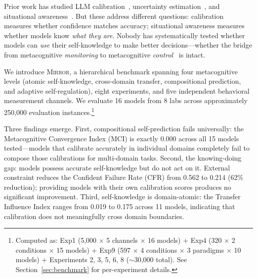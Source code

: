\documentclass[10pt]{article}
\newcommand{\mirror}{\textsc{Mirror}}
\newcommand{\MCI}{MCI}
\newcommand{\CFR}{CFR}
\begin{document}
Prior work has studied LLM calibration~\citep{kadavath2022language,
kapoor2024calibration}, uncertainty estimation~\citep{lin2024generating}, and
situational awareness~\citep{laine2024me}. But these address different questions:
calibration measures whether confidence matches accuracy; situational awareness
measures whether models know \textit{what they are}. Nobody has systematically
tested whether models can \textit{use} their self-knowledge to make better
decisions---whether the bridge from metacognitive \textit{monitoring} to
metacognitive \textit{control}~\citep{nelson1990metamemory} is intact.

We introduce \mirror{}, a hierarchical benchmark spanning four metacognitive levels
(atomic self-knowledge, cross-domain transfer, compositional prediction, and
adaptive self-regulation), eight experiments, and five independent behavioral
measurement channels. We evaluate 16 models from 8 labs across approximately
250,000 evaluation instances.\footnote{Computed as: Exp1 (5,000 $\times$ 5 channels $\times$ 16 models) + Exp4 (320 $\times$ 2 conditions $\times$ 15 models) + Exp9 (597 $\times$ 4 conditions $\times$ 3 paradigms $\times$ 10 models) + Experiments 2, 3, 5, 6, 8 ($\sim$30,000 total). See Section~\ref{sec:benchmark} for per-experiment details.}

Three findings emerge. First, compositional self-prediction fails universally: the
Metacognitive Convergence Index (\MCI{}) is exactly 0.000 across all 15 models
tested---models that calibrate accurately in individual domains completely fail to
compose those calibrations for multi-domain tasks. Second, the knowing-doing gap:
models possess accurate self-knowledge but do not act on it. External constraint
reduces the Confident Failure Rate (\CFR{}) from 0.562 to 0.214 (62\% reduction);
providing models with their own calibration scores produces no significant
improvement. Third, self-knowledge is domain-atomic: the Transfer Influence Index
ranges from 0.019 to 0.175 across 11 models, indicating that calibration does not
meaningfully cross domain boundaries.
\end{document}
